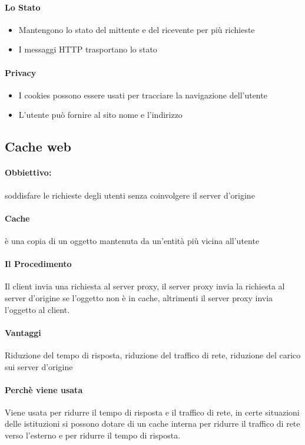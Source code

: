             \paragraph{Lo Stato}
                \begin{itemize}
                    \item Mantengono lo stato del mittente e del ricevente per più richieste
                    \item I messaggi \Acrshort*{HTTP} trasportano lo stato
                \end{itemize}
            \paragraph{Privacy}
                \begin{itemize}
                    \item I cookies possono essere usati per tracciare la navigazione dell'utente
                    \item L'utente può fornire al sito nome e l'indirizzo
                \end{itemize}
    \subsection{Cache web}
        \paragraph{Obbiettivo:} soddisfare le richieste degli utenti senza coinvolgere il server d'origine
        \paragraph{Cache} è una copia di un oggetto mantenuta da un'entità più vicina all'utente
        \paragraph{Il Procedimento} Il client invia una richiesta al server proxy, il server proxy invia la richiesta al server d'origine se l'oggetto non è in cache, altrimenti il server proxy invia l'oggetto al client.
        \paragraph{Vantaggi} Riduzione del tempo di risposta, riduzione del traffico di rete, riduzione del carico sui server d'origine
        \paragraph{Perchè viene usata} Viene usata per ridurre il tempo di risposta e il traffico di rete, in certe situazioni delle istituzioni si possono dotare di un cache interna per ridurre il traffico di rete verso l'esterno e per ridurre il tempo di risposta.
